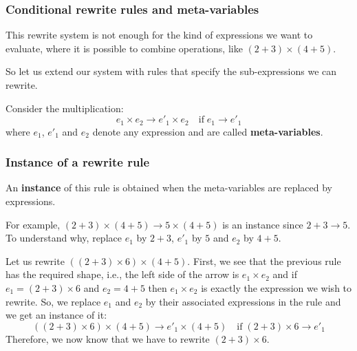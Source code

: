 %
\begin{frame}
\frametitle{Conditional rewrite rules and meta-variables}

This rewrite system is not enough for the kind of expressions we want
to evaluate, where it is possible to combine operations, like \((2+3)
\times (4+5)\).

\bigskip

So let us extend our system with rules that specify the
sub-expressions we can rewrite.

\bigskip

Consider the multiplication:
\[
e_1 \times e_2 \rightarrow e'_1 \times e_2 \quad \text{if} \; e_1
\rightarrow e'_1
\]
where \(e_1\), \(e'_1\) and \(e_2\) denote any expression and are
called \textbf{meta-variables}.

\end{frame}

%
\begin{frame}
\frametitle{Instance of a rewrite rule}

An \textbf{instance} of this rule is obtained when the meta-variables
are replaced by expressions.

\bigskip

For example, \( (2+3) \times (4+5) \rightarrow 5 \times (4+5) \) is an
instance since \(2 + 3 \rightarrow 5\). To understand why, replace
\(e_1\) by \(2+3\), \(e'_1\) by \(5\) and \(e_2\) by \(4+5\).

\bigskip

Let us rewrite \(((2 + 3) \times 6) \times (4+5)\). First, we see that
the previous rule has the required shape, i.e., the left side of the
arrow is \(e_1 \times e_2\) and if \(e_1 = (2+3) \times 6\) and \(e_2
= 4+5\) then \(e_1 \times e_2\) is exactly the expression we wish to
rewrite. So, we replace \(e_1\) and \(e_2\) by their associated
expressions in the rule and we get an instance of it:
\[
((2 + 3) \times 6) \times (4+5) \rightarrow e'_1 \times (4+5) \quad
\text{if} \; (2+3) \times 6 \rightarrow e'_1
\]
Therefore, we now know that we have to rewrite \((2 + 3) \times 6\).

\end{frame}


